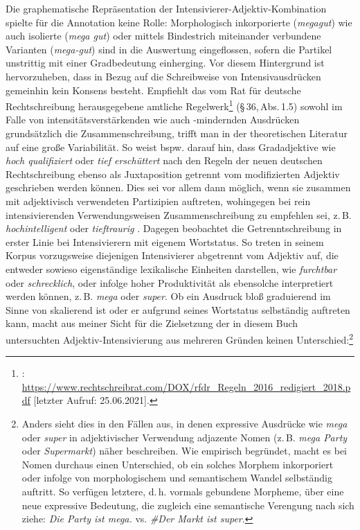 Die graphematische Repräsentation der Intensivierer-Adjektiv-Kombination spielte für die Annotation keine Rolle: Morphologisch inkorporierte (\textit{megagut}) wie auch isolierte (\textit{mega gut}) oder mittels Bindestrich miteinander verbundene Varianten (\textit{mega-gut}) sind in die Auswertung eingeflossen, sofern die Partikel unstrittig mit einer Gradbedeutung einherging. Vor diesem Hintergrund ist hervorzuheben, dass in Bezug auf die Schreibweise von Intensivausdrücken gemeinhin kein Konsens besteht. Empfiehlt das vom Rat für deutsche Rechtschreibung herausgegebene amtliche Regelwerk\footnote{\citet[38]{Rfdr.2018}:
  \url{https://www.rechtschreibrat.com/DOX/rfdr_Regeln_2016_redigiert_2018.pdf} [letzter Aufruf: 25.06.2021].
} (§\,36,\,Abs.\,1.5) sowohl im Falle von intensitätsverstärkenden wie auch -mindernden Ausdrücken grundsätzlich die Zusammenschreibung, trifft man in der theoretischen Literatur auf eine große Variabilität. So weist bspw. \citet[203]{Gualberto.2011} darauf hin, dass Gradadjektive wie \textit{hoch qualifiziert} oder \textit{tief erschüttert} nach den Regeln der neuen deutschen Rechtschreibung ebenso als Juxtaposition getrennt vom modifizierten Adjektiv geschrieben werden können. Dies sei vor allem dann möglich, wenn sie zusammen mit adjektivisch verwendeten Partizipien auftreten, wohingegen bei rein intensivierenden Verwendungsweisen Zusammenschreibung zu empfehlen sei, z.\,B. \textit{hochintelligent} oder \textit{tieftraurig} \citep[vgl.][203]{Gualberto.2011}. Dagegen beobachtet \citet[]{Renz.2020} die Getrenntschreibung in erster Linie bei Intensivierern mit eigenem Wortstatus. So treten in seinem Korpus vorzugsweise diejenigen Intensivierer abgetrennt vom Adjektiv auf, die entweder sowieso eigenständige lexikalische Einheiten darstellen, wie \textit{furchtbar} oder \textit{schrecklich}, oder infolge hoher Produktivität als ebensolche interpretiert werden können, z.\,B. \textit{mega} oder \textit{super}. Ob ein Ausdruck bloß graduierend im Sinne von skalierend ist oder er aufgrund seines Wortstatus selbständig auftreten kann, macht aus meiner Sicht für die Zielsetzung der in diesem Buch untersuchten Adjektiv-Intensivierung aus mehreren Gründen keinen Unterschied:\footnote{Anders
  sieht dies in den Fällen aus, in denen expressive Ausdrücke wie \textit{mega} oder \textit{super} in adjektivischer Verwendung adjazente Nomen (z.\,B. \textit{mega Party} oder \textit{Supermarkt}) näher beschreiben. Wie \citet[]{Ehrmantraut.2022} empirisch begründet, macht es bei Nomen durchaus einen Unterschied, ob ein solches Morphem inkorporiert oder infolge von morphologischem und semantischem Wandel selbständig auftritt. So verfügen letztere, d.\,h. vormals gebundene Morpheme, über eine neue expressive Bedeutung, die zugleich eine semantische Verengung nach sich ziehe: \textit{Die Party ist mega.} vs. \textit{\#Der Markt ist super}.
}
